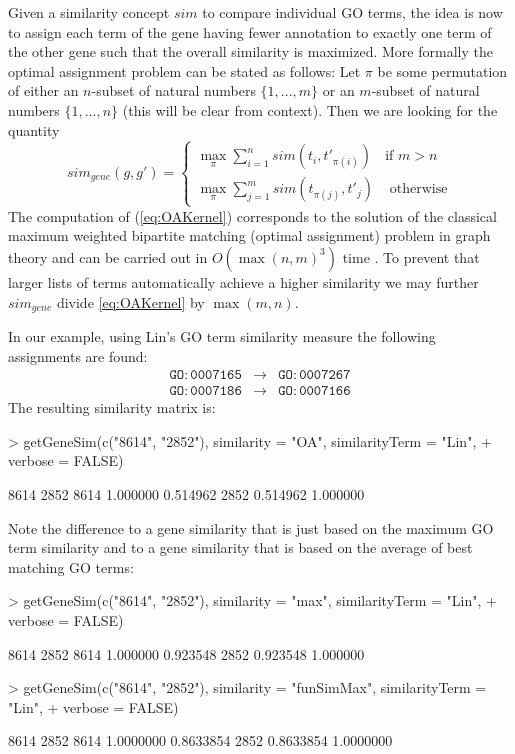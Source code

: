\documentclass[12pt,a4paper]{article}
\begin{document}
Given a similarity concept $sim$ to compare individual GO terms, the idea is now to assign each term of the gene having fewer annotation to exactly one term of the other gene such that the overall similarity is maximized. More formally the optimal assignment problem can be stated as follows: Let $\pi$ be some permutation of either an $n$-subset of natural numbers
$\{1,...,m\}$ or an $m$-subset of natural numbers $\{1,...,n\}$ (this will
be clear from context). Then we are looking for the quantity
\begin{equation}
sim_{gene}(g,g')=\left\{ \begin{array}{cc}
\max_{\pi}\sum_{i=1}^{n}sim(t_{i},t'_{\pi(i)}) & \textrm{if }m>n\\
\max_{\pi}\sum_{j=1}^{m}sim(t_{\pi(j)},t'_{j}) & \textrm{ otherwise}
\end{array}\right.\label{eq:OAKernel}
\end{equation}
The computation of (\ref{eq:OAKernel}) corresponds to the solution
of the classical maximum weighted bipartite matching (optimal assignment)
problem in graph theory and can be carried out in $O(\max(n,m)^{3})$
time \cite{LEDABook99}. 
To prevent that larger lists of terms automatically
achieve a higher similarity we may further $sim_{gene}$ divide \ref{eq:OAKernel} by $\max(m,n)$.

In our example, using Lin's GO term similarity measure the following assignments are found:
\begin{eqnarray}
\mathtt{GO:0007165} & \to & \mathtt{GO:0007267}\\
\mathtt{GO:0007186} & \to & \mathtt{GO:0007166}
\end{eqnarray}
The resulting similarity matrix is:
\begin{Schunk}
\begin{Sinput}
> getGeneSim(c("8614", "2852"), similarity = "OA", similarityTerm = "Lin", 
+     verbose = FALSE)
\end{Sinput}
\begin{Soutput}
         8614     2852
8614 1.000000 0.514962
2852 0.514962 1.000000
\end{Soutput}
\end{Schunk}

Note the difference to a gene similarity that is just based on the maximum GO term similarity and to a gene similarity that is based on the average of best matching GO terms:
\begin{Schunk}
\begin{Sinput}
> getGeneSim(c("8614", "2852"), similarity = "max", similarityTerm = "Lin", 
+     verbose = FALSE)
\end{Sinput}
\begin{Soutput}
         8614     2852
8614 1.000000 0.923548
2852 0.923548 1.000000
\end{Soutput}
\begin{Sinput}
> getGeneSim(c("8614", "2852"), similarity = "funSimMax", similarityTerm = "Lin", 
+     verbose = FALSE)
\end{Sinput}
\begin{Soutput}
          8614      2852
8614 1.0000000 0.8633854
2852 0.8633854 1.0000000
\end{Soutput}
\end{Schunk}
\end{document}
